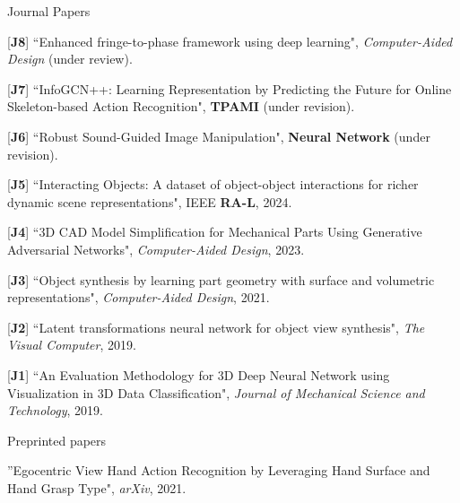 \begin{cventries}
\vspace{-.5em}
\cvpub
{Journal Papers} %
{ %
\begin{cvitems}
    \item {[\textbf{J8}] ``Enhanced fringe-to-phase framework using deep learning", \textit{Computer-Aided Design} (under review).}
    \item {[\textbf{J7}] ``InfoGCN++: Learning Representation by Predicting the Future for Online Skeleton-based Action Recognition", \textbf{TPAMI} (under revision). }
    \item {[\textbf{J6}] ``Robust Sound-Guided Image Manipulation", \textbf{Neural Network} (under revision).}
    \item {[\textbf{J5}] ``Interacting Objects: A dataset of object-object interactions for richer dynamic scene representations", IEEE \textbf{RA-L}, 2024.}
    \item {[\textbf{J4}] ``3D CAD Model Simplification for Mechanical Parts Using Generative Adversarial Networks", \textit{Computer-Aided Design}, 2023.}
    \item {[\textbf{J3}] ``Object synthesis by learning part geometry with surface and volumetric representations", \textit{Computer-Aided Design}, 2021.}
    \item {[\textbf{J2}] ``Latent transformations neural network for object view synthesis", \textit{The Visual Computer}, 2019.}
    \item {[\textbf{J1}] ``An Evaluation Methodology for 3D Deep Neural Network using Visualization in 3D Data Classification", \textit{Journal of Mechanical Science and Technology}, 2019.}
\end{cvitems}
}

\vspace{-.5em}
\cvpub
{Preprinted papers} %
{
\begin{cvitems}
    \item {''Egocentric View Hand Action Recognition by Leveraging Hand Surface and Hand Grasp Type", \textit{arXiv}, 2021. }
\end{cvitems}
}


\end{cventries}
